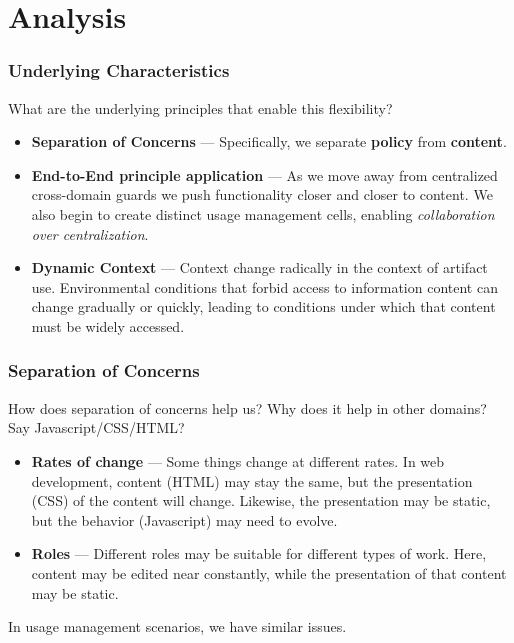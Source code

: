 \documentclass[t,handout, 10pt]{beamer}
\begin{document}
\section{Analysis}

\begin{frame}
\frametitle{Underlying Characteristics}
What are the underlying principles that enable this flexibility?
\pause
\begin{itemize}
\item \textbf{Separation of Concerns} --- Specifically, we separate \textbf{policy} from \textbf{content}.
\pause
\item \textbf{End-to-End principle application} --- As we move away from centralized cross-domain guards we push functionality closer and closer to content.  We also begin to create distinct usage management cells, enabling \textit{collaboration over centralization}.
\pause
\item \textbf{Dynamic Context} --- Context change radically in the context of artifact use.  Environmental conditions that forbid access to information content can change gradually or quickly, leading to conditions under which that content must be widely accessed.
\pause
\end{itemize}
\end{frame}

\begin{frame}
\frametitle{Separation of Concerns}
How does separation of concerns help us?
\newline
\newline
\pause
Why does it help in other domains? Say Javascript/CSS/HTML?
\begin{itemize}
\item \textbf{Rates of change} --- Some things change at different rates.  In web development, content (HTML) may stay the same, but the presentation (CSS) of the content will change.  Likewise, the presentation may be static, but the behavior (Javascript)  may need to evolve.
\item \textbf{Roles} --- Different roles may be suitable for different types of work.  Here, content may be edited near constantly, while the presentation of that content may be static.
\end{itemize}
\pause
In usage management scenarios, we have similar issues.
\end{frame}
\end{document}
